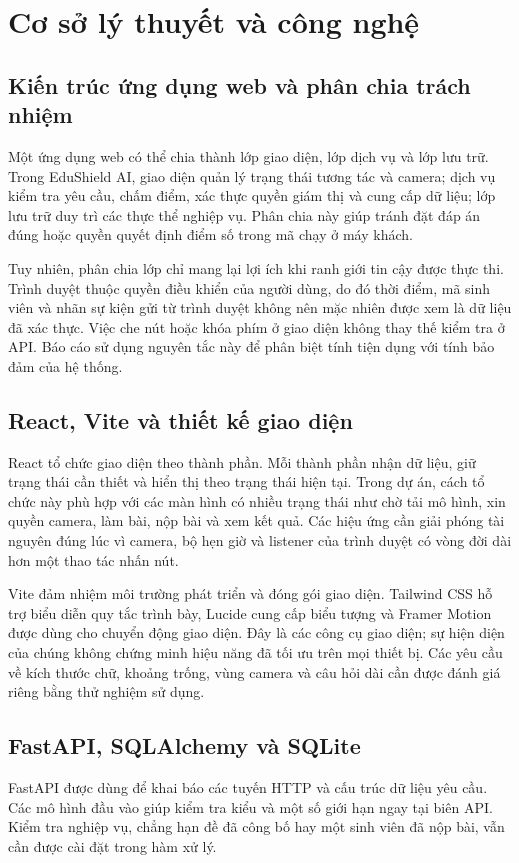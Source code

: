 \chapter{Cơ sở lý thuyết và công nghệ}
\section{Kiến trúc ứng dụng web và phân chia trách nhiệm}
Một ứng dụng web có thể chia thành lớp giao diện, lớp dịch vụ và lớp lưu trữ. Trong EduShield AI, giao diện quản lý trạng thái tương tác và camera; dịch vụ kiểm tra yêu cầu, chấm điểm, xác thực quyền giám thị và cung cấp dữ liệu; lớp lưu trữ duy trì các thực thể nghiệp vụ. Phân chia này giúp tránh đặt đáp án đúng hoặc quyền quyết định điểm số trong mã chạy ở máy khách.

Tuy nhiên, phân chia lớp chỉ mang lại lợi ích khi ranh giới tin cậy được thực thi. Trình duyệt thuộc quyền điều khiển của người dùng, do đó thời điểm, mã sinh viên và nhãn sự kiện gửi từ trình duyệt không nên mặc nhiên được xem là dữ liệu đã xác thực. Việc che nút hoặc khóa phím ở giao diện không thay thế kiểm tra ở API. Báo cáo sử dụng nguyên tắc này để phân biệt tính tiện dụng với tính bảo đảm của hệ thống.

\section{React, Vite và thiết kế giao diện}
React tổ chức giao diện theo thành phần. Mỗi thành phần nhận dữ liệu, giữ trạng thái cần thiết và hiển thị theo trạng thái hiện tại. Trong dự án, cách tổ chức này phù hợp với các màn hình có nhiều trạng thái như chờ tải mô hình, xin quyền camera, làm bài, nộp bài và xem kết quả. Các hiệu ứng cần giải phóng tài nguyên đúng lúc vì camera, bộ hẹn giờ và listener của trình duyệt có vòng đời dài hơn một thao tác nhấn nút.

Vite đảm nhiệm môi trường phát triển và đóng gói giao diện. Tailwind CSS hỗ trợ biểu diễn quy tắc trình bày, Lucide cung cấp biểu tượng và Framer Motion được dùng cho chuyển động giao diện. Đây là các công cụ giao diện; sự hiện diện của chúng không chứng minh hiệu năng đã tối ưu trên mọi thiết bị. Các yêu cầu về kích thước chữ, khoảng trống, vùng camera và câu hỏi dài cần được đánh giá riêng bằng thử nghiệm sử dụng.

\section{FastAPI, SQLAlchemy và SQLite}
FastAPI được dùng để khai báo các tuyến HTTP và cấu trúc dữ liệu yêu cầu. Các mô hình đầu vào giúp kiểm tra kiểu và một số giới hạn ngay tại biên API. Kiểm tra nghiệp vụ, chẳng hạn đề đã công bố hay một sinh viên đã nộp bài, vẫn cần được cài đặt trong hàm xử lý.

